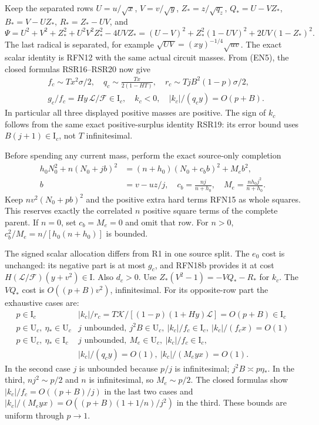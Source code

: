 Keep the separated rows
$U=u/\sqrt{x}$, $V=v/\sqrt{y}$, $Z_*=z/\sqrt{q_z}$,
$Q_*=U-VZ_*$, $B_*=V-UZ_*$, $R_*=Z_*-UV$, and
\[
\Psi=U^2+V^2+Z_*^2+U^2V^2Z_*^2-4UVZ_*
=(U-V)^2+Z_*^2(1-UV)^2+2UV(1-Z_*)^2.                 \tag{EN12}
\]
The last radical is separated, for example
$\sqrt{UV}=(xy)^{-1/4}\sqrt{uv}$.
The exact scalar identity is RFN12 with the same actual circuit
masses. From (EN5), the closed formulas RSR16--RSR20 now give
\[
\begin{aligned}
&f_c\sim Tx^2\sigma/2,\quad
q_c\sim\frac{Tx}{2(1-HT)},\quad
r_c\sim TjB^2(1-p)\sigma/2,\\
&g_c/f_c=Hy\,\mathcal L/\mathcal F\in\mathrm I_c,\quad
k_c<0,\quad |k_c|/(q_cy)=O(p+B).
\end{aligned}                                                    \tag{EN13}
\]
In particular all three displayed positive masses are positive.
The sign of $k_c$ follows from the same exact positive-surplus
identity RSR19: its error bound uses $B(j+1)\in\mathrm I_c$,
not $T$ infinitesimal.

Before spending any current mass, perform the exact source-only
completion
\[
\begin{aligned}
h_0N_0^2+n(N_0+jb)^2
&=(n+h_0)(N_0+c_bb)^2+M_eb^2,\\
b&=v-uz/j,\quad c_b=\frac{nj}{n+h_0},\quad
M_e=\frac{nh_0j^2}{n+h_0}.
\end{aligned}                                                    \tag{EN14}
\]
Keep $nv^2(N_0+pb)^2$ and the positive extra hard terms RFN15
as whole squares. This reserves exactly the correlated $n$ positive square terms
of the complete parent. If $n=0$, set $c_b=M_e=0$ and omit that
row. For $n>0$, $c_b^2/M_e=n/[h_0(n+h_0)]$ is bounded.

The signed scalar allocation differs from R1 in one source split.
The $e_0$ cost is unchanged: its negative part is at most $g_c$,
and RFN18b provides it at cost
$H(\mathcal L/\mathcal F)(y+v^2)\in\mathrm I$.
Also $d_c>0$. Use $Z_*(V^2-1)=-VQ_*-R_*$ for $k_c$.
The $VQ_*$ cost is $O((p+B)v^2)$, infinitesimal.
For its opposite-row part the exhaustive cases are:
\[
\begin{array}{c|l}
p\in\mathrm I_c&
 |k_c|/r_c=
 T\mathcal K/[(1-p)(1+Hy)\mathcal L]=O(p+B)\in\mathrm I_c\\
p\in\mathrm U_c,\ \eta_*\in\mathrm U_c&
 j\text{ unbounded},\ j^2B\in\mathrm U_c,\ 
 |k_c|/f_c\in\mathrm I_c,\ |k_c|/(f_cx)=O(1)\\
p\in\mathrm U_c,\ \eta_*\in\mathrm I_c&
 j\text{ unbounded},\ M_e\in\mathrm U_c,\ 
 |k_c|/f_c\in\mathrm I_c,\\
& |k_c|/(q_cy)=O(1),\ |k_c|/(M_eyx)=O(1).
\end{array}                                                    \tag{EN15}
\]
In the second case $j$ is unbounded because $p/j$ is infinitesimal;
$j^2B\asymp p\eta_*$. In the third,
$nj^2\sim p/2$ and $n$ is infinitesimal, so $M_e\sim p/2$.
The closed formulas show
$|k_c|/f_c=O((p+B)/j)$ in the last two cases and
$|k_c|/(M_eyx)=O((p+B)(1+1/n)/j^2)$ in the third.
These bounds are uniform through $p\to1$.

